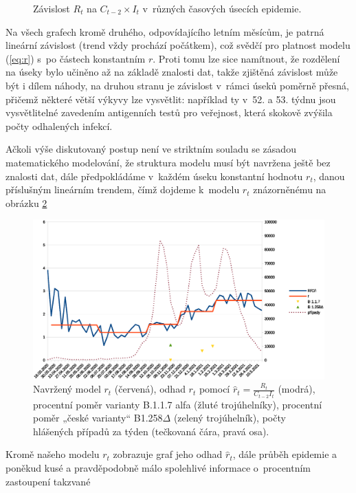 \begin{figure}
\begin{center}
\caption{Závislost $R_t$ na $C_{t-2} \times I_t$ v~různých časových úsecích epidemie.}
\label{fig:xy5}
\end{center}
\end{figure}
Na všech grafech kromě druhého, odpovídajícího letním měsícům, je patrná lineární závislost (trend
vždy prochází počátkem), což svědčí pro platnost
modelu (\ref{eq:r}) s~po částech konstantním $r$. Proti tomu lze sice namítnout,
že rozdělení na úseky bylo učiněno až na základě znalosti dat, takže zjištěná závislost může být i dílem náhody, na druhou stranu je závislost v~rámci úseků poměrně přesná, přičemž některé větší výkyvy lze vysvětlit: například ty v~52. a 53.
týdnu jsou vysvětlitelné zavedením antigenních testů pro veřejnost,
která skokově zvýšila počty odhalených infekcí. 

Ačkoli výše diskutovaný postup není ve striktním souladu se zásadou matematického modelování, že struktura modelu musí být navržena ještě bez znalosti dat, dále předpokládáme v~každém úseku konstantní hodnotu $r_{t}$,
danou příslušným lineárním trendem, čímž dojdeme k~modelu $r_{t}$ znázorněnému na obrázku \ref{fig:model}
\begin{figure}
\begin{center}
\includegraphics[scale=0.4]{pic/whole}
\caption{Navržený model $r_t$ (červená), odhad $r_t$ pomocí $\hat{r}_t = \frac{R_{t}}{C_{t-2}I_{t}}$ (modrá), procentní poměr varianty B.1.1.7 alfa (žluté trojúhelníky), procentní poměr „české varianty“ B1.258$\Delta$ (zelený trojúhelník), počty hlášených případů za týden (tečkovaná čára, pravá osa).}
\label{fig:model}
\end{center}
\end{figure}
Kromě našeho modelu $r_t$ zobrazuje graf jeho odhad $\hat r_t$, dále průběh epidemie a poněkud kusé a pravděpodobně málo spolehlivé informace o~procentním zastoupení takzvané
